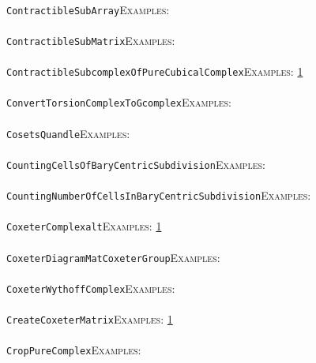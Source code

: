 \documentclass[a4paper,11pt]{report}
\begin{document}
{{ \\
 \texttt{ContractibleSubArray}{\nobreakspace}{\nobreakspace}{\nobreakspace}{\nobreakspace}\textsc{Examples:} \\
 \\
 \texttt{ContractibleSubMatrix}{\nobreakspace}{\nobreakspace}{\nobreakspace}{\nobreakspace}\textsc{Examples:} \\
 \\
 \texttt{ContractibleSubcomplexOfPureCubicalComplex}{\nobreakspace}{\nobreakspace}{\nobreakspace}{\nobreakspace}\textsc{Examples:} \href{../www/SideLinks/About/aboutCubical.html} {1}{\nobreakspace} \\
 \\
 \texttt{ConvertTorsionComplexToGcomplex}{\nobreakspace}{\nobreakspace}{\nobreakspace}{\nobreakspace}\textsc{Examples:} \\
 \\
 \texttt{CosetsQuandle}{\nobreakspace}{\nobreakspace}{\nobreakspace}{\nobreakspace}\textsc{Examples:} \\
 \\
 \texttt{CountingCellsOfBaryCentricSubdivision}{\nobreakspace}{\nobreakspace}{\nobreakspace}{\nobreakspace}\textsc{Examples:} \\
 \\
 \texttt{CountingNumberOfCellsInBaryCentricSubdivision}{\nobreakspace}{\nobreakspace}{\nobreakspace}{\nobreakspace}\textsc{Examples:} \\
 \\
 \texttt{CoxeterComplex{\textunderscore}alt}{\nobreakspace}{\nobreakspace}{\nobreakspace}{\nobreakspace}\textsc{Examples:} \href{tutorial/chap6.html} {1}{\nobreakspace} \\
 \\
 \texttt{CoxeterDiagramMatCoxeterGroup}{\nobreakspace}{\nobreakspace}{\nobreakspace}{\nobreakspace}\textsc{Examples:} \\
 \\
 \texttt{CoxeterWythoffComplex}{\nobreakspace}{\nobreakspace}{\nobreakspace}{\nobreakspace}\textsc{Examples:} \\
 \\
 \texttt{CreateCoxeterMatrix}{\nobreakspace}{\nobreakspace}{\nobreakspace}{\nobreakspace}\textsc{Examples:} \href{../www/SideLinks/About/aboutDavisComplex.html} {1}{\nobreakspace} \\
 \\
 \texttt{CropPureComplex}{\nobreakspace}{\nobreakspace}{\nobreakspace}{\nobreakspace}\textsc{Examples:} \\
}}
\end{document}
